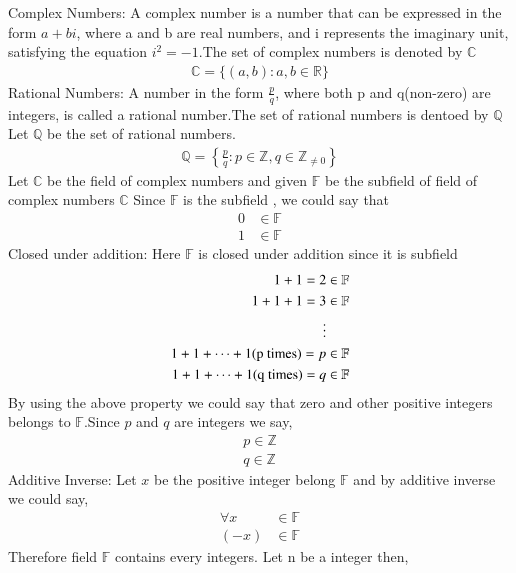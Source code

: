 
{Complex Numbers:}
A complex number is a number that can be expressed in the form $a + bi$, where a and b are real numbers, and i represents the imaginary unit, satisfying the equation $i^2 =-1$.The set of complex numbers is denoted by $\mathbb{C}$
\begin{align}
    \mathbb{C}=\{(a,b):a,b \in \mathbb{R}\}
\end{align}
{Rational Numbers:}
A number in the form $\frac{p}{q}$, where both p and q(non-zero) are integers, is called a rational number.The set of rational numbers is dentoed by $\mathbb{Q}$
Let $\mathbb{Q}$ be the set of rational numbers.
\begin{align}
    \mathbb{Q}=\left\{\frac{p}{q}:p \in \mathbb{Z},q \in \mathbb{Z}_{\not=0} \right\}\label{eq:solutions/1/1/7/q}
\end{align}
Let $\mathbb{C}$ be the field of complex numbers and given $\mathbb{F}$ be the subfield of field of complex numbers $\mathbb{C}$ 
Since $\mathbb{F}$ is the subfield , we could say that 
\begin{align}
    0 &\in \mathbb{F} 
\label{eq:solutions/1/1/7/0}
\\
    1 &\in \mathbb{F}
\end{align}
{Closed under addition:}
Here $\mathbb{F}$ is closed under addition since it is subfield
\begin{align}
    1+1=2&\in \mathbb{F}\\
    1+1+1=3&\in \mathbb{F}\\
    \vdots\notag\\
    1+1+\dots+1\text{(p times)}= p &\in \mathbb{F}\label{eq:solutions/1/1/7/p}\\
    1+1+\dots+1\text{(q times)}= q &\in \mathbb{F}\label{eq:solutions/1/1/7/q1}
\end{align}
By using the above property we could say that zero and other positive integers belongs to $\mathbb{F}$.Since $p$ and $q$ are integers we say,
\begin{align}
    p \in \mathbb{Z}\\
    q \in \mathbb{Z}
\end{align}
{Additive Inverse:}
Let $x$ be the positive integer belong $\mathbb{F}$ and by additive inverse we could say, 
\begin{align}
    \forall x &\in \mathbb{F}\label{eq:solutions/1/1/7/1}\\
    (-x) &\in \mathbb{F} \label{eq:solutions/1/1/7/2}
\end{align}
Therefore field $\mathbb{F}$ contains every integers. Let n be a integer then,
